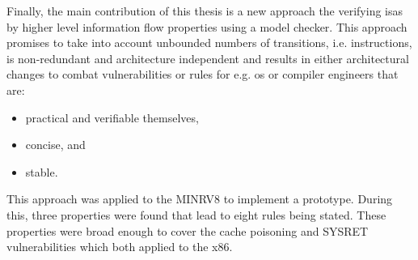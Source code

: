Finally, the main contribution of this thesis is a new approach the verifying \glspl{isa} by higher level information flow properties using a model checker.
This approach promises to take into account unbounded numbers of transitions, i.e. instructions, is non-redundant and architecture independent and results in either architectural changes to combat vulnerabilities or rules for e.g. \gls{os} or compiler engineers that are:
\begin{itemize}
    \item practical and verifiable themselves,
    \item concise, and
    \item stable.
\end{itemize}

This approach was applied to the MINRV8 to implement a prototype.
During this, three properties were found that lead to eight rules being stated.
These properties were broad enough to cover the cache poisoning and SYSRET vulnerabilities which both applied to the x86.
